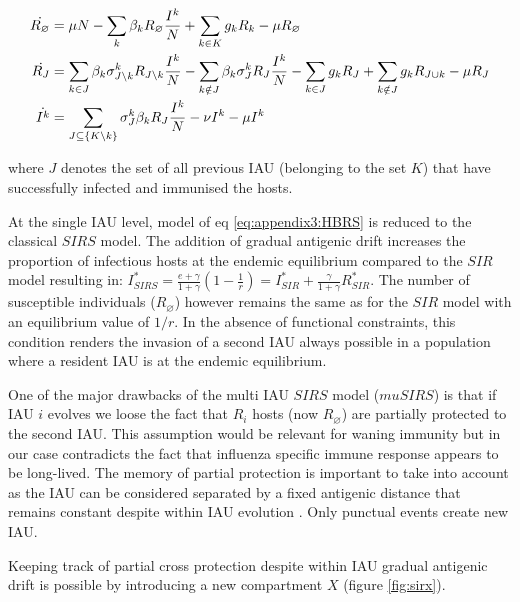 \begin{align}
  \label{eq:appendix3:HBRS}
  \dot{R_\varnothing} &= \mu N -\sum_k \beta_k R_\varnothing \frac{I^k}{N} +\sum_{k \in K} g_k
  R_k - \mu R_\varnothing\\
  \dot{R_J} &= \sum_{k \in J} \beta_k {\sigma}^k_{J \setminus k} R_{J
    \setminus k} \frac{I^k}{N} - \sum_{k \notin J} \beta_k {\sigma}^k_J R_J \frac{I^k}{N} -
  \sum_{k \in J} g_k R_J + \sum_{k \notin J} g_k
  R_{J \cup k} -\mu R_J \notag \\
  \dot{I^k} &= \sum_{J \subseteq \{K \setminus k\}} {\sigma}^k_J \beta_k
  R_J \frac{I^k}{N} -\nu I^k -\mu I^k \notag
\end{align}

where $J$ denotes the set of all previous IAU (belonging to the set
$K$) that have successfully infected and immunised the hosts.

At the single IAU level, model of eq \eqref{eq:appendix3:HBRS} is
reduced to the classical $SIRS$ model. The addition of gradual
antigenic drift increases the proportion of infectious hosts at the
endemic equilibrium compared to the $SIR$ model resulting in:
$I_{SIRS}^*=\frac{e+\gamma}{1+\gamma} (1-\frac{1}{r}) =I_{SIR}^* +
\frac{\gamma}{1+\gamma}R_{SIR}^*$. The number of susceptible
individuals ($R_\varnothing$) however remains the same as for the
$SIR$ model with an equilibrium value of $1/r$.  In the absence of
functional constraints, this condition renders the invasion of a
second IAU always possible in a population where a resident IAU is at
the endemic equilibrium.


One of the major drawbacks of the multi IAU $SIRS$ model ($muSIRS$) is
that if IAU $i$ evolves we loose the fact that $R_i$ hosts (now
$R_\varnothing$) are partially protected to the second IAU. This
assumption would be relevant for waning immunity but in our case
contradicts the fact that influenza specific immune response appears
to be long-lived. The memory of partial protection is important to
take into account as the IAU can be considered separated by a fixed
antigenic distance that remains constant despite within IAU evolution
\citep{Blackburne2008}. Only punctual events create new IAU.


Keeping track of partial cross protection despite within IAU gradual
antigenic drift is possible by introducing a new compartment $X$
(figure \ref{fig:sirx}).


